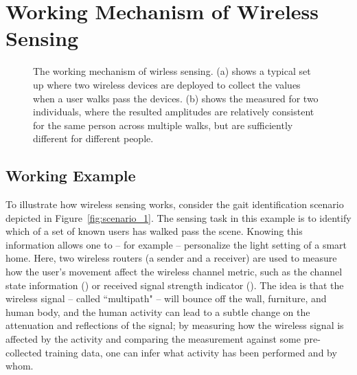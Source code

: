 \section{Working Mechanism of Wireless Sensing\label{sec:mechanism}}
\begin{figure} [t!]
       \centering
     \caption{The working mechanism of wirless sensing. (a) shows a typical set up where two wireless devices are deployed
     to collect the \CSI values when a user walks pass the devices. (b)  shows the measured \CSI  for two
     individuals, where the resulted \CSI amplitudes are relatively consistent for the same person across multiple walks, but are sufficiently different for different people.}
     \label{fig:csi_demo}
\end{figure}


\subsection{Working Example}
To illustrate how wireless sensing works, consider the gait identification scenario depicted in Figure~\ref{fig:scenario_1}. The sensing
task in this example is to identify which of a set of known users has walked pass the scene. Knowing this information allows one to -- for
example -- personalize the light setting of a smart home. Here, two wireless routers (a sender and a receiver) are used to measure how the
user's movement affect the wireless channel metric, such as the channel state information (\CSI) or received signal strength indicator
(\RSSI). The idea is that the wireless signal -- called ``multipath" -- will bounce off the wall, furniture, and human body, and the human
activity can lead to a subtle change on the attenuation and reflections of the signal; by measuring how the wireless signal is affected by
the activity and comparing the measurement against some pre-collected training data, one can infer what activity has been performed and by
whom.

